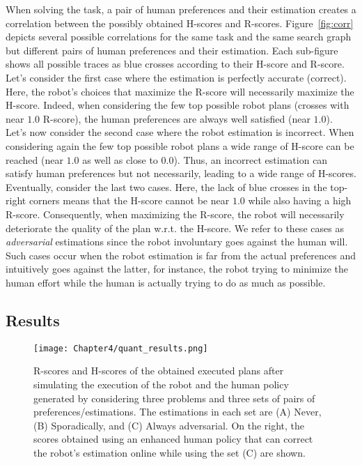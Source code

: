 When solving the task, a pair of human preferences and their estimation creates a correlation between the possibly obtained H-scores and R-scores. Figure~\ref{fig:corr} depicts several possible correlations for the same task and the same search graph but different pairs of human preferences and their estimation. Each sub-figure shows all possible traces as blue crosses according to their H-score and R-score. 
Let's consider the first case where the estimation is perfectly accurate (correct). Here, the robot's choices that maximize the R-score will necessarily maximize the H-score. Indeed, when considering the few top possible robot plans (crosses with near $1.0$ R-score), the human preferences are always well satisfied (near $1.0$). 
Let's now consider the second case where the robot estimation is incorrect. When considering again the few top possible robot plans a wide range of H-score can be reached (near $1.0$ as well as close to $0.0$). Thus, an incorrect estimation can satisfy human preferences but not necessarily, leading to a wide range of H-scores.
Eventually, consider the last two cases. Here, the lack of blue crosses in the top-right corners means that the H-score cannot be near $1.0$ while also having a high R-score. Consequently, when maximizing the R-score, the robot will necessarily deteriorate the quality of the plan w.r.t. the H-score. We refer to these cases as \textit{adversarial} estimations since the robot involuntary goes against the human will. Such cases occur when the robot estimation is far from the actual preferences and intuitively goes against the latter, for instance, the robot trying to minimize the human effort while the human is actually trying to do as much as possible.  

    \subsection*{Results}

\begin{figure}
    \centering
    \texttt{[image: Chapter4/quant\_results.png]}
    \caption{
    R-scores and H-scores of the obtained executed plans after simulating the execution of the robot and the human policy generated by considering three problems and three sets of pairs of preferences/estimations. 
    The estimations in each set are (A) Never, (B) Sporadically, and (C) Always adversarial. On the right, the scores obtained using an enhanced human policy that can correct the robot's estimation online while using the set (C) are shown.
    }    
    \label{fig:heatmaps}
\end{figure}

